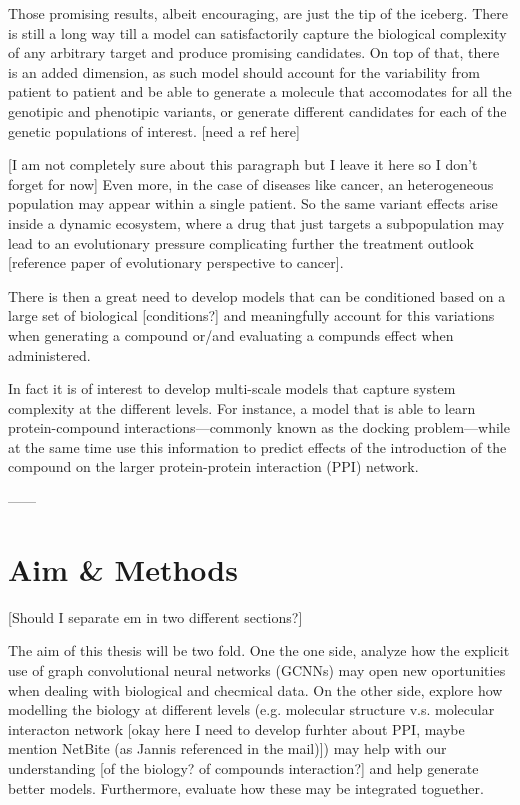 \documentclass{article}
\begin{document}
Those promising results, albeit encouraging, are just the tip of the iceberg. There is
still a long way till a model can satisfactorily capture the biological complexity of
any arbitrary target and produce promising candidates. On top of that, there is an added
dimension, as such model should account for the variability from patient to patient and
be able to generate a molecule that accomodates for all the genotipic and phenotipic
variants, or generate different candidates for each of the genetic populations of
interest. [need a ref here]

[I am not completely sure about this paragraph but I leave it here so I don't forget for
now] Even more, in the case of diseases like cancer, an heterogeneous population may
appear within a single patient. So the same variant effects arise inside a dynamic
ecosystem, where a drug that just targets a subpopulation may lead to an evolutionary
pressure complicating further the treatment outlook [reference paper of evolutionary
perspective to cancer].

There is then a great need to develop models that can be conditioned based on a large
set of biological [conditions?] and meaningfully account for this variations when
generating a compound or/and evaluating a compunds effect when administered.

In fact it is of interest to develop multi-scale models that capture system complexity
at the different levels. For instance, a model that is able to learn protein-compound
interactions---commonly known as the docking problem---while at the same time use this
information to predict effects of the introduction of the compound on the larger
protein-protein interaction (PPI) network.

------

    \section*{Aim \& Methods}
[Should I separate em in two different sections?]

The aim of this thesis will be two fold. One the one side, analyze how the explicit use
of graph convolutional neural networks (GCNNs) may open new oportunities when dealing
with biological and checmical data. On the other side, explore how modelling the biology
at different levels (e.g. molecular structure v.s. molecular interacton network [okay
here I need to develop furhter about PPI, maybe mention NetBite (as Jannis referenced in
the mail)]) may help with our understanding [of the biology? of compounds interaction?]
and help generate better models. Furthermore, evaluate how these may be integrated
toguether.
\end{document}
